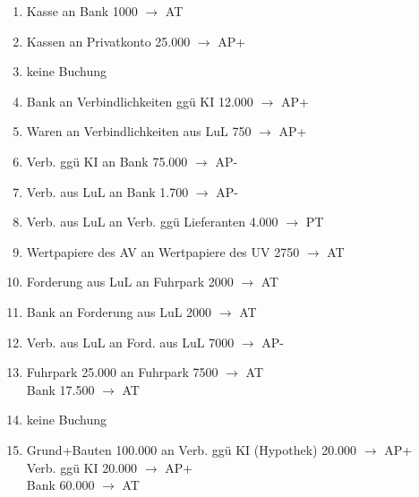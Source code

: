 \documentclass[paper=a4, fontsize=11pt]{scrartcl}
\numberwithin{equation}{section}
\numberwithin{figure}{section}
\numberwithin{table}{section}
\begin{document}
\begin{enumerate}
\item Kasse an Bank 1000 $\rightarrow$ AT
\item Kassen an Privatkonto 25.000 $\rightarrow$ AP+
\item keine Buchung
\item Bank an Verbindlichkeiten ggü KI 12.000 $\rightarrow$ AP+
\item Waren an Verbindlichkeiten aus LuL 750 $\rightarrow$ AP+
\item Verb. ggü KI an Bank 75.000 $\rightarrow$ AP-
\item Verb. aus LuL an Bank 1.700 $\rightarrow$ AP-
\item Verb. aus LuL an Verb. ggü Lieferanten 4.000  $\rightarrow$ PT
\item Wertpapiere des AV an Wertpapiere des UV 2750 $\rightarrow$ AT
\item Forderung aus LuL an Fuhrpark 2000 $\rightarrow$ AT
\item Bank an Forderung aus LuL 2000 $\rightarrow$ AT
\item Verb. aus LuL an Ford. aus LuL 7000 $\rightarrow$ AP-
\item Fuhrpark 25.000 an Fuhrpark 7500 $\rightarrow$ AT \\
Bank 17.500 $\rightarrow$ AT
\item keine Buchung
\item Grund+Bauten 100.000 an Verb. ggü KI (Hypothek) 20.000 $\rightarrow$ AP+ \\
Verb. ggü KI 20.000 $\rightarrow$ AP+ \\
Bank 60.000 $\rightarrow$ AT
\end{enumerate}
\end{document}
